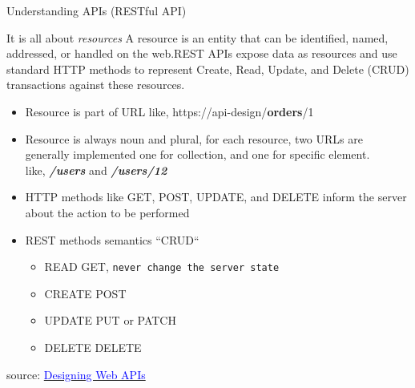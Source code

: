 \documentclass{beamer}
\begin{document}
\begin{frame}[t]{Understanding APIs \small (RESTful API)}
	
	\scriptsize 
	\begin{block}{It is all about \textit{resources}}
		A resource is an entity that can be identified, named, addressed, or handled on the web.REST APIs expose data as resources
		and use standard HTTP methods to represent Create, Read, Update, and Delete (CRUD) transactions against these resources.
	\end{block}  
  
  \scriptsize 
   \begin{itemize}
    \scriptsize 
   	\item<2-> Resource is part of URL like, https://api-design/\textbf{orders}/1
   	\item<3-> Resource is always noun and plural, for each resource, two URLs are generally implemented one for collection, 
   	and one for specific element.\\ like, \textit{\textbf{/users}} and \textit{\textbf{/users/12}}
   	\item<4-> HTTP methods like GET, POST, UPDATE, and DELETE inform the server about the action to be performed
   	\item<5-> REST methods semantics ``CRUD``
   		\begin{itemize}
   				\scriptsize 
  			\item READ   \hspace{.53cm} \rightarrow GET, \texttt{never change the server state}
   			\item CREATE \hspace{.2cm} \rightarrow POST
   			\item UPDATE \hspace{.15cm} \rightarrow PUT or PATCH
   			\item DELETE \hspace{.18cm} \rightarrow DELETE
   		\end{itemize}
   \end{itemize}	   
  
  \vspace{2mm}
  \scriptsize { source: \href{https://www.oreilly.com/library/view/designing-web-apis/9781492026914/}
  		{\textcolor{blue}{Designing Web APIs}}}
  
\end{frame}
\end{document}
